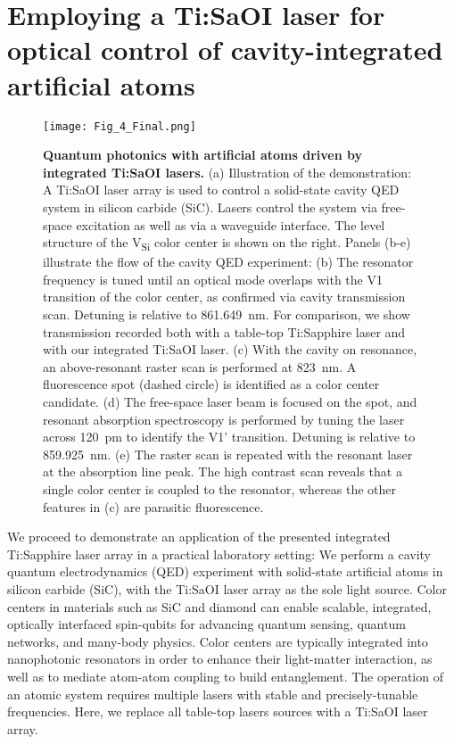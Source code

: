 \documentclass[amsmath, amsthm, amssymb, aps, prb, superscriptaddress, twocolumn, nofootinbib, 10pt]{revtex4-1}%
\begin{document}
\section{Employing a Ti:SaOI laser for optical control of cavity-integrated artificial atoms}
%
%
\begin{figure*}[t]
\texttt{[image: Fig\_4\_Final.png]}
\centering
\caption{\textbf{Quantum photonics with artificial atoms driven by integrated Ti:SaOI lasers.} (a) Illustration of the demonstration: A Ti:SaOI laser array is used to control a solid-state cavity QED system in silicon carbide (SiC). Lasers control the system via free-space excitation as well as via a waveguide interface. The level structure of the V\textsubscript{Si} color center is shown on the right. Panels (b-e) illustrate the flow of the cavity QED experiment: (b) The resonator frequency is tuned until an optical mode overlaps with the V1 transition of the color center, as confirmed via cavity transmission scan. Detuning is relative to 861.649~nm. For comparison, we show transmission recorded both with a table-top Ti:Sapphire laser and with our integrated Ti:SaOI laser. (c) With the cavity on resonance, an above-resonant raster scan is performed at 823~nm. A fluorescence spot (dashed circle) is identified as a color center candidate. (d) The free-space laser beam is focused on the spot, and resonant absorption spectroscopy is performed by tuning the laser across 120~pm to identify the V1' transition. Detuning is relative to 859.925~nm. (e) The raster scan is repeated with the resonant laser at the absorption line peak. The high contrast scan reveals that a single color center is coupled to the resonator, whereas the other features in (c) are parasitic fluorescence.}
\label{fig_4}
\end{figure*}

We proceed to demonstrate an application of the presented integrated Ti:Sapphire laser array in a practical laboratory setting: We perform a cavity quantum electrodynamics (QED) experiment with solid-state artificial atoms in silicon carbide (SiC), with the Ti:SaOI laser array as the sole light source.  Color centers in materials such as SiC and diamond \cite{awschalom2018quantum} can enable scalable, integrated, optically interfaced spin-qubits for advancing quantum sensing\cite{aslam2023quantum}, quantum networks\cite{bhaskar2020experimental}, and many-body physics\cite{davis2023probing}. Color centers are typically integrated into nanophotonic resonators in order to enhance their light-matter interaction, as well as to mediate atom-atom coupling to build entanglement\cite{evans2018photon, lukin2023two}. The operation of an atomic system requires multiple lasers with stable and precisely-tunable frequencies. Here, we replace all table-top lasers sources with a Ti:SaOI laser array.
\end{document}
